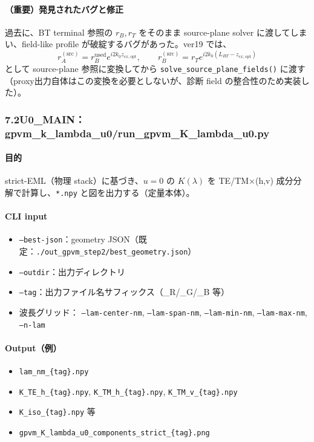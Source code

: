 \documentclass[a4paper,11pt]{jsarticle} %
\begin{document}
\paragraph{（重要）発見されたバグと修正}
過去に、BT terminal 参照の $r_B,r_T$ をそのまま source-plane solver に渡してしまい、field-like profile が破綻するバグがあった。ver19 では、
\[
r_A^{(\mathrm{src})}=r_B^{\mathrm{used}}e^{i2k_0 z_{ex,\mathrm{opt}}},
\qquad
r_B^{(\mathrm{src})}=r_T e^{i2k_0(L_{BT}-z_{ex,\mathrm{opt}})}
\]
として source-plane 参照に変換してから \texttt{solve\_source\_plane\_fields()} に渡す（proxy出力自体はこの変換を必要としないが、診断 field の整合性のため実装した）。

\subsubsection*{7.2\;U0\_MAIN：gpvm\_k\_lambda\_u0/run\_gpvm\_K\_lambda\_u0.py}
\paragraph{目的}
strict-EML（物理 stack）に基づき、$u=0$ の $K(\lambda)$ を TE/TM×(h,v) 成分分解で計算し、\texttt{*.npy} と図を出力する（定量本体）。

\paragraph{CLI input}
\begin{itemize}
\item \texttt{--best-json}：geometry JSON（既定：\texttt{./out\_gpvm\_step2/best\_geometry.json}）
\item \texttt{--outdir}：出力ディレクトリ
\item \texttt{--tag}：出力ファイル名サフィックス（\_R/\_G/\_B 等）
\item 波長グリッド：
  \texttt{--lam-center-nm}, \texttt{--lam-span-nm}, \texttt{--lam-min-nm}, \texttt{--lam-max-nm}, \texttt{--n-lam}
\end{itemize}

\paragraph{Output（例）}
\begin{itemize}
\item \texttt{lam\_nm\_\{tag\}.npy}
\item \texttt{K\_TE\_h\_\{tag\}.npy}, \texttt{K\_TM\_h\_\{tag\}.npy}, \texttt{K\_TM\_v\_\{tag\}.npy}
\item \texttt{K\_iso\_\{tag\}.npy} 等
\item \texttt{gpvm\_K\_lambda\_u0\_components\_strict\_\{tag\}.png}
\end{itemize}
\end{document}

